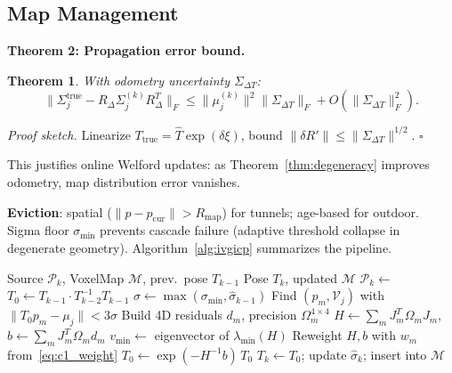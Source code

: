 \documentclass[journal,letterpaper,10pt]{IEEEtran}
\newtheorem{theorem}{Theorem}
\newcommand{\vmin}{v_{\min}}
\begin{document}
\subsection{Map Management}\label{sec:impl}

\textbf{Theorem 2: Propagation error bound.}
\begin{theorem}\label{thm:map}
With odometry uncertainty $\Sigma_{\Delta T}$:
\begin{equation}
  \|\Sigma_j^{\mathrm{true}} - R_\Delta\Sigma_j^{(k)}R_\Delta^T\|_F
  \leq \|\mu_j^{(k)}\|^2 \|\Sigma_{\Delta T}\|_F + O(\|\Sigma_{\Delta T}\|_F^2).
  \label{eq:thm2}
\end{equation}
\end{theorem}
\textit{Proof sketch.}
Linearize $T_{\mathrm{true}} = \hat{T}\exp(\delta\xi)$,
bound $\|\delta R'\| \leq \|\Sigma_{\Delta T}\|^{1/2}$. $\square$

This justifies online Welford updates: as Theorem~\ref{thm:degeneracy}
improves odometry, map distribution error vanishes.

\textbf{Eviction}: spatial ($\|p-p_{\mathrm{cur}}\|>R_{\mathrm{map}}$)
for tunnels; age-based for outdoor.
Sigma floor $\sigma_{\min}$ prevents cascade failure
(adaptive threshold collapse in degenerate geometry).
Algorithm~\ref{alg:ivgicp} summarizes the pipeline.

\begin{algorithm}[t]
\caption{IV-GICP Per-Frame Pipeline}\label{alg:ivgicp}
\begin{algorithmic}[1]
\Require Source $\mathcal{P}_k$, VoxelMap $\mathcal{M}$, prev.\ pose $T_{k-1}$
\Ensure Pose $T_k$, updated $\mathcal{M}$
\State $\mathcal{P}_k \gets$ 
\State $T_0 \gets T_{k-1} \cdot T_{k-2}^{-1} T_{k-1}$ 
\State $\sigma \gets \max(\sigma_{\min}, \hat\sigma_{k-1})$
  \State Find $(p_m, \mathcal{V}_j)$ with $\|T_0 p_m - \mu_j\| < 3\sigma$
  \State Build 4D residuals $d_m$, precision $\Omega_m^{4\times4}$ 
  \State $H \gets \textstyle\sum_m J_m^T \Omega_m J_m$, $b \gets \textstyle\sum_m J_m^T \Omega_m d_m$
    \State $\vmin \gets$ eigenvector of $\lambda_{\min}(H)$
    \State Reweight $H, b$ with $w_m$ from~\eqref{eq:c1_weight}
  \EndIf
  \State $T_0 \gets \exp(-H^{-1}b)\, T_0$
\EndFor
\State $T_k \gets T_0$; \quad update $\hat\sigma_k$; \quad insert into $\mathcal{M}$
\end{algorithmic}
\end{algorithm}
\end{document}
